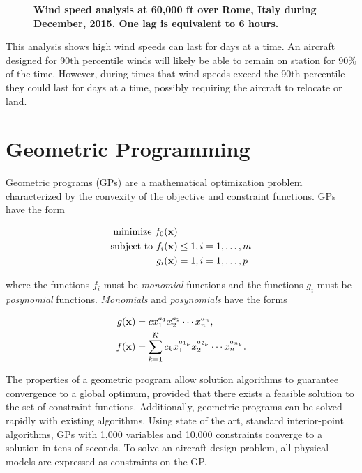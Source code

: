 \documentclass[]{aiaa-tc}%
\begin{document}
\begin{figure}[H]
 \begin{subfigmatrix}{2}%
 \end{subfigmatrix}
 \caption{\textbf{Wind speed analysis at 60,000 ft over Rome, Italy during December, 2015. One lag is equivalent to 6 hours. }}
 \label{f:romewinds}
\end{figure}

This analysis shows high wind speeds can last for days at a time.  
An aircraft designed for 90th percentile winds will likely be able to remain on station for 90\% of the time.  
However, during times that wind speeds exceed the 90th percentile they could last for days at a time, possibly requiring the aircraft to relocate or land. 

\section{Geometric Programming\cite{gp}}

Geometric programs (GPs) are a mathematical optimization problem characterized by the convexity of the objective and constraint functions. GPs have the form

\begin{align} 
\label{e:gpform}
\text{minimize } f_0(\bold{x}) & \nonumber \\
\text{subject to  } f_i(\bold{x}) &\leq 1, i=1,\ldots,m \\
g_i (\bold{x}) &= 1, i = 1,\ldots,p \nonumber 
\end{align}

where the functions $f_i$ must be \emph{monomial} functions and the functions $g_i$ must be \emph{posynomial} functions. \emph{Monomials} and \emph{posynomials} have the forms

\begin{align}
 \label{e:mon}
g(\bold{x}) &= c x_1^{a_1} x_2^{a_2} \dotsm x_n^{a_n} , \\
\label{e:pos}
f(\bold{x}) &= \displaystyle\sum_{k=1}^K c_k x_1^{a_{1_k}} x_2^{a_{2_k}} \dotsm x_n^{a_{n_k}}.
\end{align}

The properties of a geometric program allow solution algorithms to guarantee convergence to a global optimum, provided that there exists a feasible solution to the set of constraint functions.  
Additionally, geometric programs can be solved rapidly with existing algorithms.  
Using state of the art, standard interior-point algorithms, GPs with 1,000 variables and 10,000 constraints converge to a solution in tens of seconds.\cite{gp}  
To solve an aircraft design problem, all physical models are expressed as constraints on the GP.\cite{hoburgthesis} \\
\end{document}

